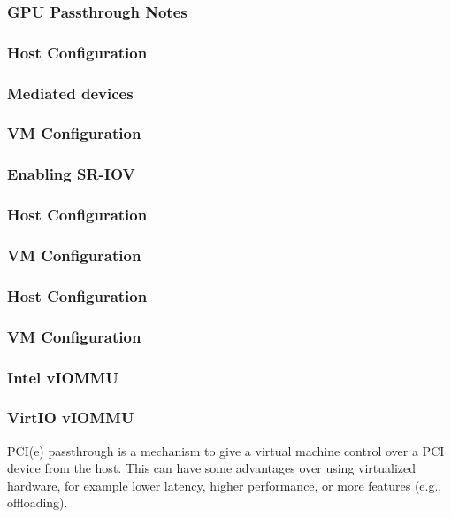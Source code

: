 \subsubsection{GPU Passthrough Notes}

\subsubsection{Host Configuration}

\subsubsection{Mediated devices}

\subsubsection{VM Configuration}

\subsubsection{Enabling SR-IOV}

\subsubsection{Host Configuration}

\subsubsection{VM Configuration}

\subsubsection{Host Configuration}

\subsubsection{VM Configuration}

\subsubsection{Intel vIOMMU}

\subsubsection{VirtIO vIOMMU}

PCI(e) passthrough is a mechanism to give a virtual machine control over a PCI device from the host. This can have some advantages over using virtualized hardware, for example lower latency, higher performance, or more features (e.g., offloading).

